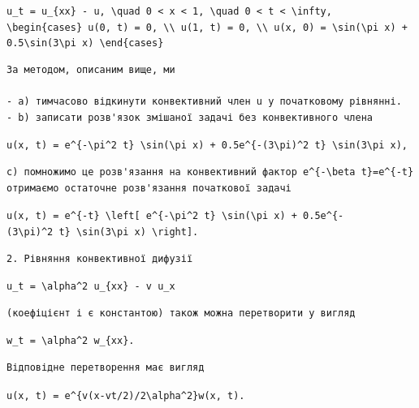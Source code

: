 \documentclass[
  ukrainian,
]{article}
\begin{document}
\texttt{u\_t\ =\ u\_\{xx\}\ -\ u,\ \textbackslash{}quad\ 0\ \textless{}\ x\ \textless{}\ 1,\ \textbackslash{}quad\ 0\ \textless{}\ t\ \textless{}\ \textbackslash{}infty,}
\texttt{\textbackslash{}begin\{cases\}\ u(0,\ t)\ =\ 0,\ \textbackslash{}\textbackslash{}\ u(1,\ t)\ =\ 0,\ \textbackslash{}\textbackslash{}\ u(x,\ 0)\ =\ \textbackslash{}sin(\textbackslash{}pi\ x)\ +\ 0.5\textbackslash{}sin(3\textbackslash{}pi\ x)\ \textbackslash{}end\{cases\}}

\begin{verbatim}
За методом, описаним вище, ми

- a) тимчасово відкинути конвективний член u у початковому рівнянні.
- b) записати розв'язок змішаної задачі без конвективного члена
\end{verbatim}

\texttt{u(x,\ t)\ =\ e\^{}\{-\textbackslash{}pi\^{}2\ t\}\ \textbackslash{}sin(\textbackslash{}pi\ x)\ +\ 0.5e\^{}\{-(3\textbackslash{}pi)\^{}2\ t\}\ \textbackslash{}sin(3\textbackslash{}pi\ x),}

\begin{verbatim}
c) помножимо це розв'язання на конвективний фактор e^{-\beta t}=e^{-t} отримаємо остаточне розв'язання початкової задачі
\end{verbatim}

\texttt{u(x,\ t)\ =\ e\^{}\{-t\}\ \textbackslash{}left{[}\ e\^{}\{-\textbackslash{}pi\^{}2\ t\}\ \textbackslash{}sin(\textbackslash{}pi\ x)\ +\ 0.5e\^{}\{-(3\textbackslash{}pi)\^{}2\ t\}\ \textbackslash{}sin(3\textbackslash{}pi\ x)\ \textbackslash{}right{]}.}

\begin{verbatim}
2. Рівняння конвективної дифузії
\end{verbatim}

\texttt{u\_t\ =\ \textbackslash{}alpha\^{}2\ u\_\{xx\}\ -\ v\ u\_x}

\begin{verbatim}
(коефіцієнт і є константою) також можна перетворити у вигляд
\end{verbatim}

\texttt{w\_t\ =\ \textbackslash{}alpha\^{}2\ w\_\{xx\}.}

\begin{verbatim}
Відповідне перетворення має вигляд
\end{verbatim}

\texttt{u(x,\ t)\ =\ e\^{}\{v(x-vt/2)/2\textbackslash{}alpha\^{}2\}w(x,\ t).}
\end{document}
